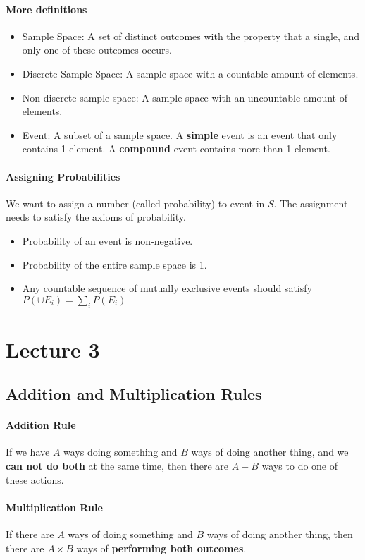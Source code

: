 \documentclass[10pt,letter]{article}
\begin{document}
\paragraph{More definitions}
\begin{itemize}
    \item Sample Space: A set of distinct outcomes with the property that a single, and only one of these outcomes occurs. 
    \item Discrete Sample Space: A sample space with a countable amount of elements. 
    \item Non-discrete sample space: A sample space with an uncountable amount of elements. 
    \item Event: A subset of a sample space. A \textbf{simple} event is an event that only contains 1 element. A \textbf{compound} event contains more than 1 element.
\end{itemize}

\paragraph{Assigning Probabilities} 
We want to assign a number (called probability) to event in $S$. The assignment needs to satisfy the axioms of probability. \begin{itemize}
    \item Probability of an event is non-negative.
    \item Probability of the entire sample space is 1.
    \item Any countable sequence of mutually exclusive events should satisfy $P(\cup E_i)=\sum_i P(E_i)$
\end{itemize}

\section*{Lecture 3}
\subsection*{Addition and Multiplication Rules} 
\paragraph{Addition Rule} If we have $A$ ways doing something and $B$ ways of doing another thing, and we \textbf{can not do both} at the same time, then there are $A+B$ ways to do one of these actions. 
\paragraph{Multiplication Rule} If there are $A$ ways of doing something and $B$ ways of doing another thing, then there are $A\times B$ ways of \textbf{performing both outcomes}.
\end{document}
